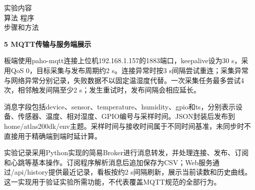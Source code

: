 \documentclass[UTF8,zihao=-4,a4paper]{ctexart}
\newcommand{\rowgap}{\vspace*{0pt}}
\begin{document}
\begin{reprow}{实验内容\\
算法 程序\\
步骤和方法}
\par\medskip
\noindent\textbf{5 MQTT传输与服务端展示}\par\nobreak
板端使用paho-mqtt连接上位机192.168.1.157的1883端口，keepalive设为30 s，采用QoS 0，目标采集与发布周期约2 s。连接异常时按3 s间隔尝试重连；采集异常与网络异常分别记录，失败数据不以固定温湿度代替。一次采集任务最多尝试4次，相邻触发间隔至少2 s；发生重试时，发布间隔会相应延长。\par

消息字段包括device、sensor、temperature、humidity、gpio和ts，分别表示设备、传感器、温度、相对湿度、GPIO编号与采样时间。JSON封装后发布到home/atlas200dk/env主题。采样时间与接收时间属于不同时间基准，未同步时不直接用于精确端到端时延计算。\par

实验记录采用Python实现的简易Broker进行消息转发，并处理连接、发布、订阅和心跳等基本操作。订阅程序解析消息后追加保存为CSV；Web服务通过/api/history提供最近记录，看板按约2 s间隔刷新，展示当前读数和历史曲线。这一实现用于验证实验所需功能，不代表覆盖MQTT规范的全部行为。\par

\end{reprow}\rowgap
\end{document}
